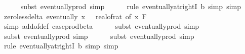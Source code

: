 \begin{isabellebody}
\ \ \ \ \isamarkupfalse%
\ {\isacharparenleft}{\kern0pt}subst\ eventually{\isacharunderscore}{\kern0pt}prod{}{\isacharprime}{\kern0pt}{\isacharcomma}{\kern0pt}\ simp{\isacharparenright}{\kern0pt}\isanewline
\ \ \ \ \isamarkupfalse%
\ {\isacharparenleft}{\kern0pt}rule\ eventually{\isacharunderscore}{\kern0pt}at{\isacharunderscore}{\kern0pt}rightI{\isacharbrackleft}{\kern0pt}\ b{\isacharequal}{\kern0pt}{\isachardoublequoteopen}{}{\isachardoublequoteclose}{\isacharbrackright}{\kern0pt}{\isacharcomma}{\kern0pt}\ simp{\isacharcomma}{\kern0pt}\ simp{\isacharparenright}{\kern0pt}\isanewline
\isanewline
\ \ \isamarkupfalse%
\ zero{\isacharunderscore}{\kern0pt}less{\isacharunderscore}{\kern0pt}delta{\isacharcolon}{\kern0pt}\ {\isachardoublequoteopen}eventually\ {\isacharparenleft}{\kern0pt}{\isasymlambda}x{\isachardot}{\kern0pt}\ {}\ {\isacharless}{\kern0pt}\ {\isacharparenleft}{\kern0pt}real{\isacharunderscore}{\kern0pt}of{\isacharunderscore}{\kern0pt}rat\ {\isacharparenleft}{\kern0pt}{\isasymdelta}{\isacharunderscore}{\kern0pt}of\ x{\isacharparenright}{\kern0pt}{\isacharparenright}{\kern0pt}{\isacharparenright}{\kern0pt}\ {\isacharquery}{\kern0pt}F{\isachardoublequoteclose}\isanewline
\ \ \ \ \isamarkupfalse%
\ {\isacharparenleft}{\kern0pt}simp\ add{\isacharcolon}{\kern0pt}{\isasymdelta}{\isacharunderscore}{\kern0pt}of{\isacharunderscore}{\kern0pt}def\ case{\isacharunderscore}{\kern0pt}prod{\isacharunderscore}{\kern0pt}beta{\isacharprime}{\kern0pt}{\isacharparenright}{\kern0pt}\isanewline
\ \ \ \ \isamarkupfalse%
\ {\isacharparenleft}{\kern0pt}subst\ eventually{\isacharunderscore}{\kern0pt}prod{}{\isacharprime}{\kern0pt}{\isacharcomma}{\kern0pt}\ simp{\isacharparenright}{\kern0pt}\isanewline
\ \ \ \ \isamarkupfalse%
\ {\isacharparenleft}{\kern0pt}subst\ eventually{\isacharunderscore}{\kern0pt}prod{}{\isacharprime}{\kern0pt}{\isacharcomma}{\kern0pt}\ simp{\isacharparenright}{\kern0pt}\isanewline
\ \ \ \ \isamarkupfalse%
\ {\isacharparenleft}{\kern0pt}subst\ eventually{\isacharunderscore}{\kern0pt}prod{}{\isacharprime}{\kern0pt}{\isacharcomma}{\kern0pt}\ simp{\isacharparenright}{\kern0pt}\isanewline
\ \ \ \ \isamarkupfalse%
\ {\isacharparenleft}{\kern0pt}rule\ eventually{\isacharunderscore}{\kern0pt}at{\isacharunderscore}{\kern0pt}rightI{\isacharbrackleft}{\kern0pt}\ b{\isacharequal}{\kern0pt}{\isachardoublequoteopen}{}{\isachardoublequoteclose}{\isacharbrackright}{\kern0pt}{\isacharcomma}{\kern0pt}\ simp{\isacharcomma}{\kern0pt}\ simp{\isacharparenright}{\kern0pt}\isanewline

\end{isabellebody}
